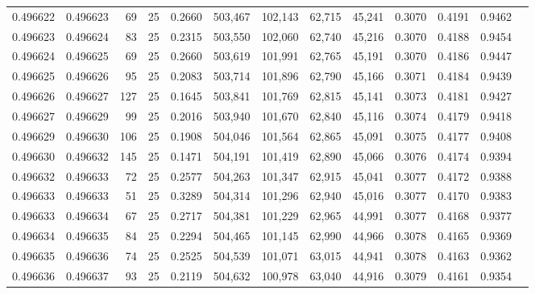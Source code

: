 \begin{tabular}{rrrrrrrrrrrrr}
0.496622 & 0.496623 &    69 &  25 &                                     0.2660 & 503,467 & 102,143 &  62,715 &  45,241 & 0.3070 & 0.4191 & 0.9462 \\
0.496623 & 0.496624 &    83 &  25 &                                     0.2315 & 503,550 & 102,060 &  62,740 &  45,216 & 0.3070 & 0.4188 & 0.9454 \\
0.496624 & 0.496625 &    69 &  25 &                                     0.2660 & 503,619 & 101,991 &  62,765 &  45,191 & 0.3070 & 0.4186 & 0.9447 \\
0.496625 & 0.496626 &    95 &  25 &                                     0.2083 & 503,714 & 101,896 &  62,790 &  45,166 & 0.3071 & 0.4184 & 0.9439 \\
0.496626 & 0.496627 &   127 &  25 &                                     0.1645 & 503,841 & 101,769 &  62,815 &  45,141 & 0.3073 & 0.4181 & 0.9427 \\
0.496627 & 0.496629 &    99 &  25 &                                     0.2016 & 503,940 & 101,670 &  62,840 &  45,116 & 0.3074 & 0.4179 & 0.9418 \\
0.496629 & 0.496630 &   106 &  25 &                                     0.1908 & 504,046 & 101,564 &  62,865 &  45,091 & 0.3075 & 0.4177 & 0.9408 \\
0.496630 & 0.496632 &   145 &  25 &                                     0.1471 & 504,191 & 101,419 &  62,890 &  45,066 & 0.3076 & 0.4174 & 0.9394 \\
0.496632 & 0.496633 &    72 &  25 &                                     0.2577 & 504,263 & 101,347 &  62,915 &  45,041 & 0.3077 & 0.4172 & 0.9388 \\
0.496633 & 0.496633 &    51 &  25 &                                     0.3289 & 504,314 & 101,296 &  62,940 &  45,016 & 0.3077 & 0.4170 & 0.9383 \\
0.496633 & 0.496634 &    67 &  25 &                                     0.2717 & 504,381 & 101,229 &  62,965 &  44,991 & 0.3077 & 0.4168 & 0.9377 \\
0.496634 & 0.496635 &    84 &  25 &                                     0.2294 & 504,465 & 101,145 &  62,990 &  44,966 & 0.3078 & 0.4165 & 0.9369 \\
0.496635 & 0.496636 &    74 &  25 &                                     0.2525 & 504,539 & 101,071 &  63,015 &  44,941 & 0.3078 & 0.4163 & 0.9362 \\
0.496636 & 0.496637 &    93 &  25 &                                     0.2119 & 504,632 & 100,978 &  63,040 &  44,916 & 0.3079 & 0.4161 & 0.9354 \\

\end{tabular}
